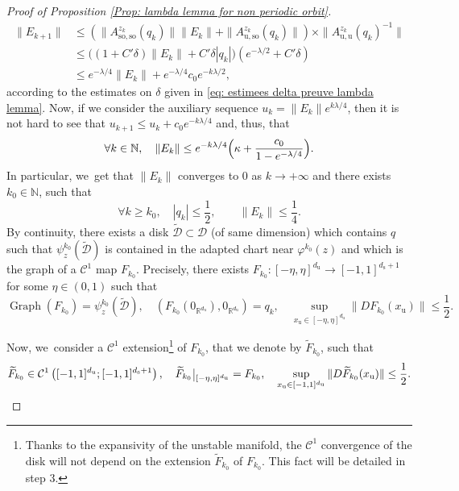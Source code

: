 \documentclass[11pt]{article}
\newcommand{\rs}{\mathrm{s}}
\newcommand{\rso}{\mathrm{so}}
\newcommand{\ru}{\mathrm{u}}
\theoremstyle{definition}
\theoremstyle{plain}
\newcommand{\Ccal}{\mathcal{C}}
\newcommand{\D}{\mathcal{D}}
\newcommand{\N}{\mathbb{N}}
\newcommand{\R}{\mathbb{R}}
\DeclareMathOperator{\Graph}{Graph}
\def\rest#1#2{\mathchoice
{\setbox1\hbox{${\displaystyle #1}_{\scriptstyle #2}$}
\restrictionaux{#1}{#2}}
{\setbox1\hbox{${\textstyle #1}_{\scriptstyle #2}$}
\restrictionaux{#1}{#2}}
{\setbox1\hbox{${\scriptstyle #1}_{\scriptscriptstyle #2}$}
\restrictionaux{#1}{#2}}
{\setbox1\hbox{${\scriptscriptstyle #1}_{\scriptscriptstyle #2}$}
\restrictionaux{#1}{#2}}}
\def\restrictionaux#1#2{{#1\,\smash{\vrule height.8\ht1 depth.85\dp1}}_{\,#2}}
\begin{document}
\begin{appendix}
\begin{proof}[Proof of Proposition \ref{Prop: lambda lemma for non periodic orbit}]
\begin{align*}
\|E_{k+1}\| &\leq \left(\|A_{\rso,\rso}^{z_k} (q_k) \| \|E_k \| + \| A_{\ru,\rso}^{z_k} (q_k) \| \right) \times \| A_{\ru,\ru}^{z_k} (q_k)^{-1}\| \\
&\leq \big((1 + C' \delta) \|E_k \| + C' \delta |q_k| \big) (e^{-\lambda/ 2} + C' \delta) \\
&\leq e^{- \lambda /4} \|E_k \| + e^{- \lambda /4 } c_0 e^{-k \lambda/ 2},
\end{align*}
according to the estimates on $\delta$ given in \eqref{eq: estimees delta preuve lambda lemma}.
Now, if we consider the auxiliary sequence $u_k = \| E_k \| e^{k \lambda / 4}$, then it is not hard to see that $u_{k + 1} \leq u_k + c_0 e^{-k \lambda /4}$ and, thus, that
\[
\forall k \in \N, \quad \|E_k \| \leq e^{- k \lambda /4} \Bigl(\kappa + \frac{c_0}{1 - e^{-\lambda/ 4}} \Bigr).
\]
In particular, we~get that $\|E_k \|$ converges to $0$ as $k \to +\infty$ and there exists $k_{0} \in \N$, such that
\[
\forall k \geq k_0, \quad |q_k| \leq \frac{1}{2}, \qquad \|E_k \| \leq \frac{1}{4}.
\]
By continuity, there exists a disk $\widetilde{\D} \subset \D$ (of same dimension) which contains $q$ such that $\psi_z^{k_0} (\widetilde{\D})$ is contained in the adapted chart near $\varphi^{k_0} (z)$ and which is the graph of a $\Ccal^{1}$ map $F_{k_0}$. Precisely, there exists $F_{k_0}: [-\eta, \eta]^{d_\ru} \to [-1,1]^{d_\rs + 1}$ for some $\eta \in (0, 1)$ such that
\[
\Graph (F_{k_0}) = \psi_z^{k_0} (\widetilde{\D}), \quad \left(F_{k_0} (0_{\R^{d_\ru}}), 0_{\R^{d_\ru}}\right) = q_k, \quad \sup_{x_\ru \in [-\eta, \eta]^{d_\ru}}\|D F_{k_0} (x_\ru) \| \leq \frac{1}{2}.
\]

Now, we~consider a $\Ccal^1$ extension\footnote{Thanks to the expansivity of the unstable manifold, the $\Ccal^1$ convergence of the disk will not depend on the extension $\widetilde{F}_{k_0}$ of $F_{k_0}$. This fact will be detailed in step 3.} of $F_{k_0}$, that we denote by $\widetilde{F}_{k_0}$, such that
\[
\widetilde{F}_{k_0} \in \Ccal^1 \left([-1,1]^{d_\ru}; [-1,1]^{d_\rs + 1} \right), \quad \rest{\widetilde{F}_{k_0}}{[-\eta, \eta]^{d_\ru}}= F_{k_0}, \quad \sup_{x_\ru \in [-1, 1]^{d_\ru}}\|D \widetilde{F}_{k_0} (x_\ru) \| \leq \frac{1}{2}.
\]


\end{proof}
\end{appendix}
\end{document}

